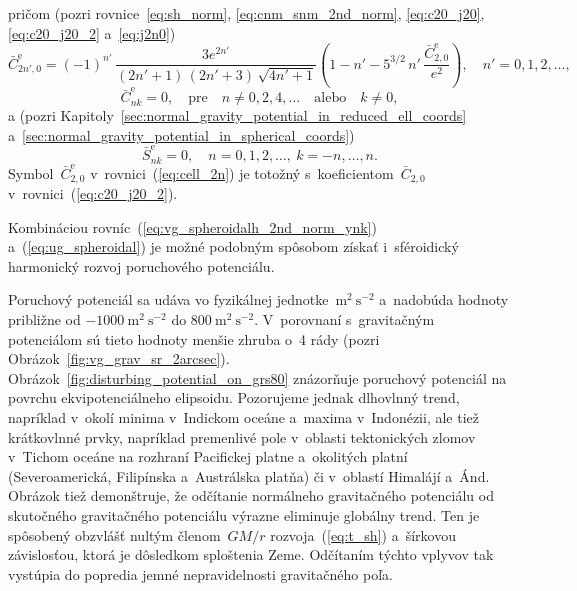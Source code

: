 \documentclass[a4paper, 12pt]{book}
\begin{document}
%
pričom (pozri rovnice~\ref{eq:sh_norm}, \ref{eq:cnm_snm_2nd_norm}, 
\ref{eq:c20_j20}, \ref{eq:c20_j20_2} a~\ref{eq:j2n0})
%
\begin{equation}
\label{eq:cell_2n}
\bar{C}^\mathrm{e}_{2n',0} = (-1)^{n'} \, \frac{3e^{2n'}}{(2n' + 1) \, (2n' 
+ 3) \, \sqrt{4n' + 1}} \left( 1 - n' - 5^{3 \slash 2} \, n' \, 
\frac{\bar{C}^\mathrm{e}_{2,0}}{e^2} \right){,} \quad n' = 0, 1, 2,\dots{,}
\end{equation}
%
\begin{equation}
\bar{C}^\mathrm{e}_{nk} = 0{,} \quad \textrm{pre} \quad n \neq 0, 2, 4,\dots 
\quad \mathrm{alebo} \quad k \neq 0{,}
\end{equation}
%
a (pozri Kapitoly~\ref{sec:normal_gravity_potential_in_reduced_ell_coords} 
a~\ref{sec:normal_gravity_potential_in_spherical_coords})
%
\begin{equation}
\bar{S}^\mathrm{e}_{nk} = 0{,} \quad n = 0, 1, 2,\dots, \ k = -n, \dots, n{.}
\end{equation}
%
Symbol~$\bar{C}^\mathrm{e}_{2,0}$ v~rovnici~(\ref{eq:cell_2n}) je totožný 
s~koeficientom~$\bar{C}_{2,0}$ v~rovnici~(\ref{eq:c20_j20_2}).

Kombináciou rovníc~(\ref{eq:vg_spheroidalh_2nd_norm_ynk}) 
a~(\ref{eq:ug_spheroidal}) je možné podobným spôsobom získať i~sféroidický 
harmonický rozvoj poruchového potenciálu.

Poruchový potenciál sa udáva vo fyzikálnej jednotke~$\mathrm{m}^2 
\ \mathrm{s}^{-2}$ a~nadobúda hodnoty približne od $-1000\ \mathrm{m}^2 
\ \mathrm{s}^{-2}$ do $800 \ \mathrm{m}^2 \ \mathrm{s}^{-2}$.  V~porovnaní 
s~gravitačným potenciálom sú tieto hodnoty menšie zhruba o~4 rády (pozri 
Obrázok~\ref{fig:vg_grav_sr_2arcsec}).  
Obrázok~\ref{fig:disturbing_potential_on_grs80} znázorňuje poruchový potenciál 
na povrchu ekvipotenciálneho elipsoidu.  Pozorujeme jednak dlhovlnný trend, 
napríklad v~okolí minima v~Indickom oceáne a~maxima v~Indonézii, ale tiež 
krátkovlnné prvky, napríklad premenlivé pole v~oblasti tektonických zlomov 
v~Tichom oceáne na rozhraní Pacifickej platne a~okolitých platní 
(Severoamerická, Filipínska a~Austrálska platňa) či v~oblastí Himalájí a~Ánd.  
Obrázok tiež demonštruje, že odčítanie normálneho gravitačného potenciálu od 
skutočného gravitačného potenciálu výrazne eliminuje globálny trend.  Ten je 
spôsobený obzvlášť nultým členom~$GM \slash r$ rozvoja~(\ref{eq:t_sh}) 
a~šírkovou závislosťou, ktorá je dôsledkom sploštenia Zeme.  Odčítaním týchto 
vplyvov tak vystúpia do popredia jemné nepravidelnosti gravitačného poľa.
\end{document}
